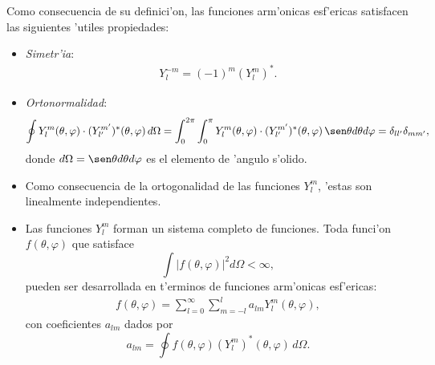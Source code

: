 Como consecuencia de su definici'on, las funciones arm'onicas esf'ericas satisfacen las siguientes 'utiles
propiedades:
 \begin{itemize}
  \item \textit{Simetr'ia}:
   \begin{eqnarray}
    Y_l^{-m} = (-1)^m (Y_l^m)^*.\label{kugel2}
   \end{eqnarray}
  \item \textit{Ortonormalidad}:
  \begin{equation}
  \oint Y_l^m (\theta,\varphi)\cdot (Y_{l'}^{m'})^*(\theta,\varphi)\, d\Omega
=\int_0^{2\pi}\int_0^\pi Y_l^m (\theta,\varphi)  \cdot
(Y_{l'}^{m'})^*(\theta,\varphi)\, \sen\theta d\theta d\varphi   =
\delta_{ll'}\delta_{mm'},
\label{est33}
\end{equation}
 donde $d\Omega = \sen\theta d\theta d\varphi$ es el elemento de 'angulo
s'olido.

\item Como consecuencia de la ortogonalidad de las funciones $Y_l^m$, 'estas son linealmente independientes.

 \item Las funciones $Y_l^m $ forman un sistema completo de funciones. Toda
funci'on $f(\theta,\varphi)$ que satisface
\begin{equation}
    \int |f(\theta,\varphi)|^2 d\Omega <\infty,
\end{equation}
pueden ser desarrollada en t'erminos de funciones arm'onicas esf'ericas:
\begin{eqnarray}
f(\theta,\varphi) = \sum_{l=0}^\infty\sum_{m=-l}^l a_{lm}Y_l^m (\theta,\varphi),
\end{eqnarray}
con coeficientes $a_{lm}$ dados por
\begin{equation}
a_{lm}=\oint f(\theta,\varphi)(Y_{l}^{m})^*(\theta,\varphi)\,d\Omega.
\end{equation}


\end{itemize}
